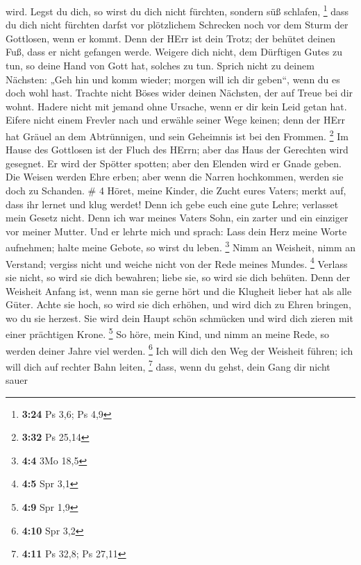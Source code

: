 wird.  Legst du dich, so wirst du dich nicht fürchten,
sondern süß schlafen, \footnote{\textbf{3:24} Ps 3,6; Ps 4,9}
 dass du dich nicht fürchten darfst vor plötzlichem
Schrecken noch vor dem Sturm der Gottlosen, wenn er kommt. 
Denn der HErr ist dein Trotz; der behütet deinen Fuß, dass er nicht
gefangen werde.  Weigere dich nicht, dem Dürftigen Gutes zu
tun, so deine Hand von Gott hat, solches zu tun.  Sprich
nicht zu deinem Nächsten: „Geh hin und komm wieder; morgen will ich dir
geben``, wenn du es doch wohl hast.  Trachte nicht Böses
wider deinen Nächsten, der auf Treue bei dir wohnt.  Hadere
nicht mit jemand ohne Ursache, wenn er dir kein Leid getan hat.
 Eifere nicht einem Frevler nach und erwähle seiner Wege
keinen;  denn der HErr hat Gräuel an dem Abtrünnigen, und
sein Geheimnis ist bei den Frommen. \footnote{\textbf{3:32} Ps 25,14}
 Im Hause des Gottlosen ist der Fluch des HErrn; aber das
Haus der Gerechten wird gesegnet.  Er wird der Spötter
spotten; aber den Elenden wird er Gnade geben.  Die Weisen
werden Ehre erben; aber wenn die Narren hochkommen, werden sie doch zu
Schanden. \# 4  Höret, meine Kinder, die Zucht eures Vaters;
merkt auf, dass ihr lernet und klug werdet!  Denn ich gebe
euch eine gute Lehre; verlasset mein Gesetz nicht.  Denn ich
war meines Vaters Sohn, ein zarter und ein einziger vor meiner Mutter.
 Und er lehrte mich und sprach: Lass dein Herz meine Worte
aufnehmen; halte meine Gebote, so wirst du leben. \footnote{\textbf{4:4}
  3Mo 18,5}  Nimm an Weisheit, nimm an Verstand; vergiss
nicht und weiche nicht von der Rede meines Mundes. \footnote{\textbf{4:5}
  Spr 3,1}  Verlass sie nicht, so wird sie dich bewahren;
liebe sie, so wird sie dich behüten.  Denn der Weisheit
Anfang ist, wenn man sie gerne hört und die Klugheit lieber hat als alle
Güter.  Achte sie hoch, so wird sie dich erhöhen, und wird
dich zu Ehren bringen, wo du sie herzest.  Sie wird dein
Haupt schön schmücken und wird dich zieren mit einer prächtigen Krone.
\footnote{\textbf{4:9} Spr 1,9}  So höre, mein Kind, und
nimm an meine Rede, so werden deiner Jahre viel werden. \footnote{\textbf{4:10}
  Spr 3,2}  Ich will dich den Weg der Weisheit führen; ich
will dich auf rechter Bahn leiten, \footnote{\textbf{4:11} Ps 32,8; Ps
  27,11}  dass, wenn du gehst, dein Gang dir nicht sauer
